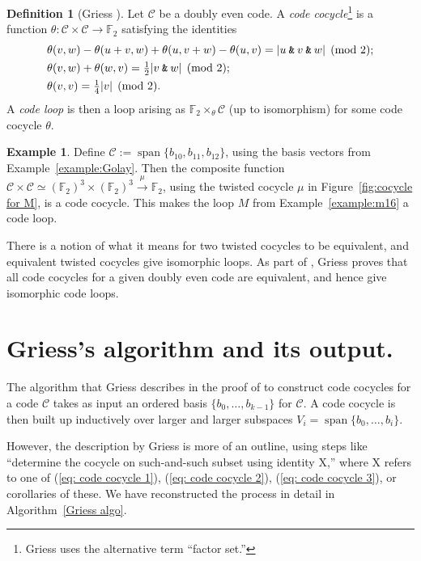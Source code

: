 \documentclass{article}
\theoremstyle{plain}
\theoremstyle{definition}
\newtheorem*{definition}{Definition}
\newtheorem{example}{Example}
\def \cC {\mathcal{C}}
\def \FF {\mathbb{F}}
\newcommand{\AND}{\mathbin{\textup{\texttt{\&}}}}
\DeclareMathOperator{\Span}{span}
\begin{document}
\begin{definition}[Griess \cite{Griess}]
\label{def:codeLoop}
Let $\cC$ be a doubly even code. 
A \emph{code cocycle}\footnote{Griess uses the alternative term ``factor set.''} is a function $\theta\colon \cC \times \cC \to \FF_2$ satisfying the identities
\begin{align}
& \theta(v,w)-\theta(u+v,w)+\theta(u,v+w)-\theta(u,v) =|u\AND v \AND w| \pmod 2; \label{eq: code cocycle 1}\\
& \theta(v,w)+\theta(w,v) = {}  \tfrac12|v\AND w| \pmod 2; \label{eq: code cocycle 2}\\
& \theta(v,v) = {}  \tfrac14|v| \pmod 2.\label{eq: code cocycle 3}
\end{align}
A \emph{code loop} is then a loop arising as $\FF_2\times_\theta \cC$ (up to isomorphism) for some code cocycle $\theta$.
\end{definition}


\begin{example}
Define $\cC := \Span\{b_{10},b_{11},b_{12}\}$, using the basis vectors from Example~\ref{example:Golay}. Then the composite function $\cC\times \cC \simeq (\FF_2)^3\times (\FF_2)^3 \xrightarrow{\mu} \FF_2$, using the twisted cocycle $\mu$ in Figure~\ref{fig:cocycle for M}, is a code cocycle. This makes the loop $M$ from Example~\ref{example:m16} a code loop.
\end{example}

There is a notion of what it means for two twisted cocycles to be equivalent, and equivalent twisted cocycles give isomorphic loops.
As part of \cite[Theorem 10]{Griess}, Griess proves that all code cocycles for a given doubly even code are equivalent, and hence give isomorphic code loops. 




\section{Griess's algorithm and its output.}

The algorithm that Griess describes in the proof of \cite[Theorem 10]{Griess} to construct code cocycles for a code $\cC$ takes as input an ordered  basis $\{b_0,\ldots,b_{k-1}\}$ for $\cC$. 
A code cocycle is then built up inductively over larger and larger subspaces $V_i = \Span\{b_0,\ldots,b_i\}$.

However, the description by Griess is more of an outline, using steps like ``determine the cocycle on such-and-such subset using identity X,'' where X refers to one of (\ref{eq: code cocycle 1}), (\ref{eq: code cocycle 2}), (\ref{eq: code cocycle 3}), or corollaries of these. We have reconstructed the process in detail in Algorithm~\ref{Griess algo}.
\end{document}
